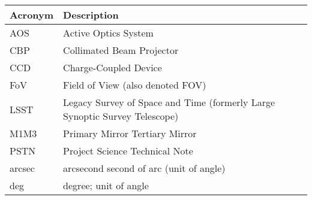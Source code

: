 \addtocounter{table}{-1}
\begin{longtable}{p{}p{}}\hline
\textbf{Acronym} & \textbf{Description}  \\\hline

AOS & Active Optics System \\\hline
CBP & Collimated Beam Projector \\\hline
CCD & Charge-Coupled Device \\\hline
FoV & Field of View (also denoted FOV) \\\hline
LSST & Legacy Survey of Space and Time (formerly Large Synoptic Survey Telescope) \\\hline
M1M3 & Primary Mirror Tertiary Mirror \\\hline
PSTN & Project Science Technical Note \\\hline
arcsec & arcsecond second of arc (unit of angle) \\\hline
deg & degree; unit of angle \\\hline
\end{longtable}
